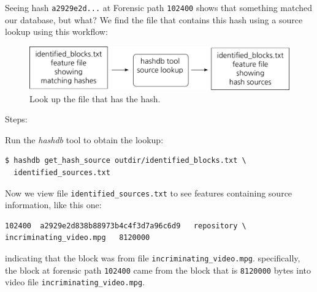 \documentclass[12pt,twoside]{article}
\newcommand{\hdb}{\emph{hashdb}\xspace}
\begin{document}
Seeing hash \texttt{a2929e2d...} at Forensic path \texttt{102400}
shows that something matched our database, but what?
We find the file that contains this hash using a source lookup
using this workflow:
\begin{figure}[h]
  \center
  \includegraphics[scale=0.5]{drawings/source_lookup}
  \caption{Look up the file that has the hash.}
  \label{fig:source_lookup}
\end{figure}

Steps:
\begin{compactenum}
\item Run the \hdb tool to obtain the lookup:
\begin{verbatim}
$ hashdb get_hash_source outdir/identified_blocks.txt \
  identified_sources.txt
\end{verbatim}
\end{compactenum}

Now we view file \texttt{identified\_sources.txt} to see
features containing source information, like this one:
\begin{verbatim}
102400	a2929e2d838b88973b4c4f3d7a96c6d9   repository \
incriminating_video.mpg   8120000
\end{verbatim}

indicating that the block was from file \texttt{incriminating\_video.mpg}.
specifically, the block at forensic path \texttt{102400} came from
the block that is \texttt{8120000} bytes into
video file \texttt{incriminating\_video.mpg}.
\end{document}
